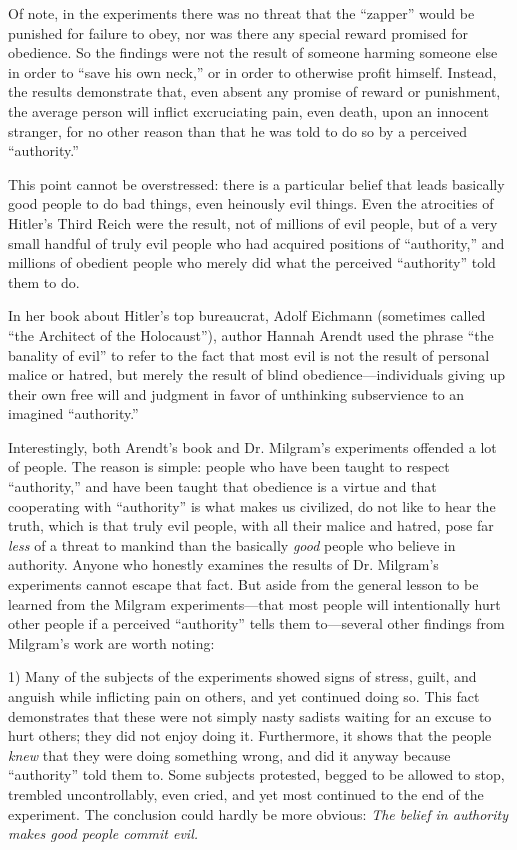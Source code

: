 \documentclass{book}
\begin{document}
Of note, in the experiments there was no threat that the \enquote{zapper} would be punished for failure to obey, nor was there any special reward promised for obedience. So the findings were not the result of someone harming someone else in order to \enquote{save his own neck,} or in order to otherwise profit himself. Instead, the results demonstrate that, even absent any promise of reward or punishment, the average person will inflict excruciating pain, even death, upon an innocent stranger, for no other reason than that he was told to do so by a perceived \enquote{authority.}

This point cannot be overstressed: there is a particular belief that leads basically good people to do bad things, even heinously evil things. Even the atrocities of Hitler's Third Reich were the result, not of millions of evil people, but of a very small handful of truly evil people who had acquired positions of \enquote{authority,} and millions of obedient people who merely did what the perceived \enquote{authority} told them to do.

In her book about Hitler's top bureaucrat, Adolf Eichmann (sometimes called \enquote{the Architect of the Holocaust}), author Hannah Arendt used the phrase \enquote{the banality of evil} to refer to the fact that most evil is not the result of personal malice or hatred, but merely the result of blind obedience---individuals giving up their own free will and judgment in favor of unthinking subservience to an imagined \enquote{authority.}

Interestingly, both Arendt's book and Dr. Milgram's experiments offended a lot of people. The reason is simple: people who have been taught to respect \enquote{authority,} and have been taught that obedience is a virtue and that cooperating with \enquote{authority} is what makes us civilized, do not like to hear the truth, which is that truly evil people, with all their malice and hatred, pose far \emph{less} of a threat to mankind than the basically \emph{good} people who believe in authority. Anyone who honestly examines the results of Dr. Milgram's experiments cannot escape that fact. But aside from the general lesson to be learned from the Milgram experiments---that most people will intentionally hurt other people if a perceived \enquote{authority} tells them to---several other findings from Milgram's work are worth noting:

1) Many of the subjects of the experiments showed signs of stress, guilt, and anguish while inflicting pain on others, and yet continued doing so. This fact demonstrates that these were not simply nasty sadists waiting for an excuse to hurt others; they did not enjoy doing it. Furthermore, it shows that the people \emph{knew} that they were doing something wrong, and did it anyway because \enquote{authority} told them to. Some subjects protested, begged to be allowed to stop, trembled uncontrollably, even cried, and yet most continued to the end of the experiment. The conclusion could hardly be more obvious: \emph{The belief in authority makes good people commit evil.}
\end{document}
